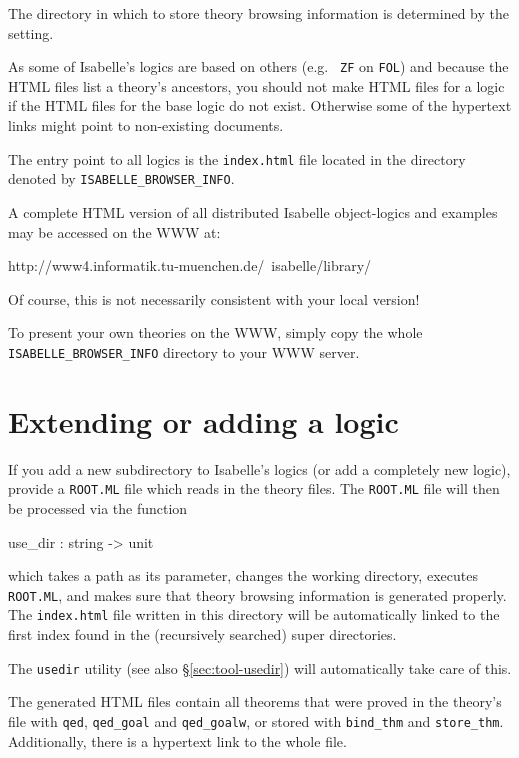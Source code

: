 \medskip The directory in which to store theory browsing information
is determined by the  setting.

\medskip As some of Isabelle's logics are based on others (e.g. {\tt
  ZF} on {\tt FOL}) and because the HTML files list a theory's
ancestors, you should not make HTML files for a logic if the HTML
files for the base logic do not exist. Otherwise some of the hypertext
links might point to non-existing documents.

The entry point to all logics is the {\tt index.html} file located in
the directory denoted by \texttt{ISABELLE_BROWSER_INFO}.

A complete HTML version of all distributed Isabelle object-logics and
examples may be accessed on the WWW at:
\begin{ttbox}
http://www4.informatik.tu-muenchen.de/~isabelle/library/
\end{ttbox}
Of course, this is not necessarily consistent with your local version!

To present your own theories on the WWW, simply copy the whole
\texttt{ISABELLE_BROWSER_INFO} directory to your WWW server.


\section{Extending or adding a logic}

If you add a new subdirectory to Isabelle's logics (or add a
completely new logic), provide a {\tt ROOT.ML} file which reads in the
theory files. The {\tt ROOT.ML} file will then be processed via the
function

\begin{ttbox}
use_dir : string -> unit
\end{ttbox}

which takes a path as its parameter, changes the working directory,
executes {\tt ROOT.ML}, and makes sure that theory browsing
information is generated properly. The {\tt index.html} file written
in this directory will be automatically linked to the first index
found in the (recursively searched) super directories.

The \texttt{usedir} utility (see also \S\ref{sec:tool-usedir}) will
automatically take care of this.

\medskip The generated HTML files contain all theorems that were
proved in the theory's \ML{} file with {\tt qed}, {\tt qed_goal} and
{\tt qed_goalw}, or stored with {\tt bind_thm} and {\tt store_thm}.
Additionally, there is a hypertext link to the whole \ML{} file.

